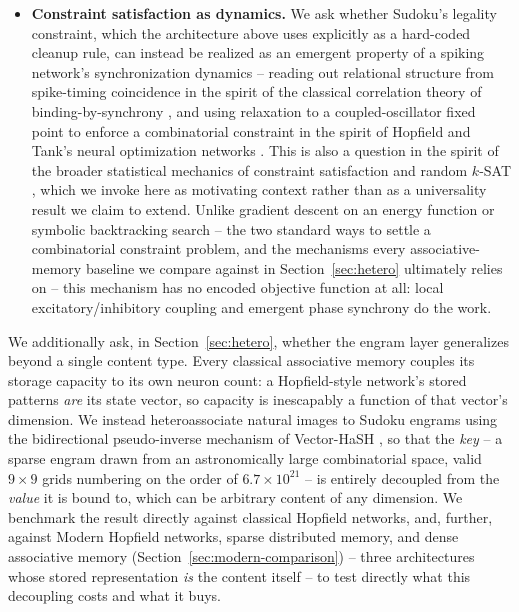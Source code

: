 \documentclass[11pt]{article}
\begin{document}
\begin{itemize}
  first-moment approximation to a genuine, non-asymptotic guarantee on failure probability.
  \item \textbf{Constraint satisfaction as dynamics.} We ask whether Sudoku's legality
  constraint, which the architecture above uses explicitly as a hard-coded cleanup rule, can
  instead be realized as an emergent property of a spiking network's synchronization
  dynamics -- reading out relational structure from spike-timing coincidence in the spirit of
  the classical correlation theory of binding-by-synchrony \cite{malsburg1981,singer1995}, and
  using relaxation to a coupled-oscillator fixed point to enforce a combinatorial constraint in
  the spirit of Hopfield and Tank's neural optimization networks \cite{hopfieldtank1985}. This
  is also a question in the spirit of the broader statistical mechanics of constraint
  satisfaction and random $k$-SAT \cite{mezard2002,mezard2009}, which we invoke here as
  motivating context rather than as a universality result we claim to extend. Unlike gradient
  descent on an energy function or symbolic backtracking search -- the two standard ways to
  settle a combinatorial constraint problem, and the mechanisms every associative-memory
  baseline we compare against in Section~\ref{sec:hetero} ultimately relies on -- this
  mechanism has no encoded objective function at all: local excitatory/inhibitory coupling and
  emergent phase synchrony do the work.
\end{itemize}

We additionally ask, in Section~\ref{sec:hetero}, whether the engram layer generalizes beyond
a single content type. Every classical associative memory couples its storage capacity to its
own neuron count: a Hopfield-style network's stored patterns \emph{are} its state vector, so
capacity is inescapably a function of that vector's dimension. We instead heteroassociate
natural images to Sudoku engrams using the bidirectional pseudo-inverse mechanism of
Vector-HaSH \cite{chandra2025}, so that the \emph{key} -- a sparse engram drawn from an
astronomically large combinatorial space, valid $9\times9$ grids numbering on the order of
$6.7\times10^{21}$ -- is entirely decoupled from the \emph{value} it is bound to, which can be
arbitrary content of any dimension. We benchmark the result directly against classical Hopfield
networks, and, further, against Modern Hopfield networks, sparse distributed memory, and dense
associative memory (Section~\ref{sec:modern-comparison}) -- three architectures whose stored
representation \emph{is} the content itself -- to test directly what this decoupling costs and
what it buys.
\end{document}
